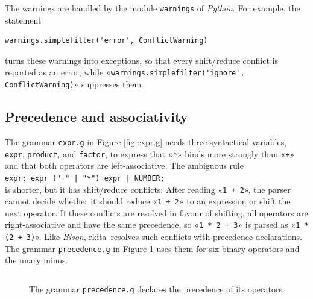 \documentclass[11pt,a4paper]{article}
\makeatletter
\newcommand{\blue}[1]{{\color{blue}#1}}
\newcommand{\fakesc}[1]{\resizebox{!}{0.99ex}{\textls[90]{\MakeUppercase{#1}}}}
\def\@simtextsc#1#2\@nil{\MakeUppercase{#1}\fakesc{#2}}
\newcommand{\simtextsc}[1]{%
  \ifmmode\text{\@simtextsc#1\@nil}\else\@simtextsc#1\@nil\fi}
\newcommand{\Larkita}{\simtextsc{Larkita}}
\newenvironment{unbreakable}{\par\noindent\begin{minipage}{\linewidth}}{\end{minipage}\par}
\newcommand{\codefigure}[5][]{\begin{figure}[H]%
  \inputminted[numbers = left, numbersep = 0.3cm, #1]{#2}{examples/#3}%
  \vspace*{-0.3cm}%
  \caption{#5}\label{#4}\end{figure}}
\newcommand{\grammarfile}[2]{\codefigure{larkita_lexer.py:LarkitaLexer}{#1}{fig:#1}{#2}}
\makeatother
\begin{document}
The warnings are handled by the module \texttt{warnings} of \textsl{Python}.  For example, the statement
\begin{unbreakable}
\begin{verbatim}
warnings.simplefilter('error', ConflictWarning)
\end{verbatim}
\end{unbreakable}
turns these warnings into exceptions, so that every shift/reduce conflict is reported as an error, while
«\verb|warnings.simplefilter('ignore', ConflictWarning)|» suppresses them.

\subsection{Precedence and associativity}
\label{sec:precedence}
The grammar \texttt{expr.g} in Figure \ref{fig:expr.g} needs three syntactical variables, \texttt{expr},
\texttt{product}, and \texttt{factor}, to express that «\verb|*|» binds more strongly than «\verb|+|» and that
both operators are left-associative.  The ambiguous rule
\\[0.2cm]
\hspace*{1.3cm}
\verb!expr: expr ("+" | "*") expr | NUMBER;!
\\[0.2cm]
is shorter, but it has shift/reduce conflicts:  After reading «\verb|1 + 2|», the parser cannot decide whether
it should reduce «\verb|1 + 2|» to an expression or shift the next operator.  If these conflicts are resolved
in favour of shifting, all operators are right-associative and have the same precedence, so
«\verb|1 * 2 + 3|» is parsed as «\verb|1 * (2 + 3)|».  Like \textsl{Bison}, \Larkita\ resolves such conflicts
with \blue{precedence declarations}.  The grammar \texttt{precedence.g} in Figure \ref{fig:precedence.g} uses
them for six binary operators and the unary minus.
\grammarfile{precedence.g}{The grammar \texttt{precedence.g} declares the precedence of its operators.}
\end{document}
